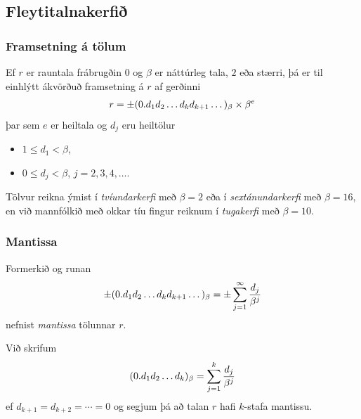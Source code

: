 \documentclass[a4paper,10pt,icelandic]{sphinxmanual}
\begin{document}
\subsection{Fleytitalnakerfið}
\label{kafli01:fleytitalnakerfi}

\subsubsection{Framsetning á tölum}
\label{kafli01:index-15}\label{kafli01:framsetning-a-tolum}
Ef \(r\) er rauntala frábrugðin \(0\) og \(\beta\) er
náttúrleg tala, \(2\) eða stærri, þá er til einhlýtt ákvörðuð
framsetning á \(r\) af gerðinni
\begin{gather}
\begin{split}r =
    \pm (0.d_1d_2\dots d_kd_{k+1}\dots)_\beta\times \beta^e\end{split}\notag
\end{gather}
þar sem \(e\) er heiltala og \(d_j\) eru heiltölur
\begin{itemize}
\item {} 
\(1\leq d_1<\beta\),

\item {} 
\(0\leq d_j<\beta\), \(j=2,3,4,\dots\).

\end{itemize}

Tölvur reikna ýmist í \emph{tvíundarkerfi} með \(\beta=2\) eða í
\emph{sextánundarkerfi} með \(\beta=16\), en við mannfólkið með okkar tíu
fingur reiknum í \emph{tugakerfi} með \(\beta=10\).


\subsubsection{Mantissa}
\label{kafli01:mantissa}\label{kafli01:index-16}
Formerkið og runan
\begin{gather}
\begin{split}\pm(0.d_1d_2\dots d_kd_{k+1}\dots)_\beta =
    \pm\sum_{j=1}^\infty \dfrac{d_j}{\beta^j}\end{split}\notag
\end{gather}
nefnist \emph{mantissa} tölunnar \(r\).

Við skrifum
\begin{gather}
\begin{split}(0.d_1d_2\dots d_k)_\beta =
    \sum_{j=1}^k \dfrac{d_j}{\beta^j}\end{split}\notag
\end{gather}
ef \(d_{k+1} = d_{k+2} = \cdots = 0\) og segjum þá að talan
\(r\) hafi \(k\)-stafa mantissu.
\end{document}

